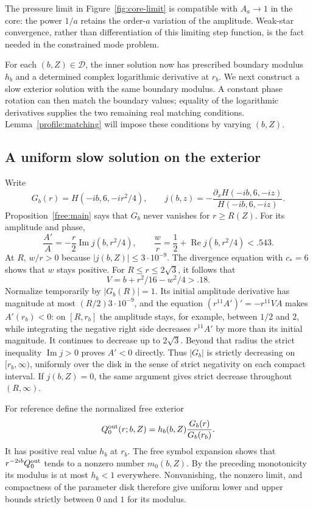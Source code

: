 \documentclass[11pt]{article}
\numberwithin{equation}{section}
\theoremstyle{definition}
\theoremstyle{remark}
\begin{document}
The pressure limit in Figure~\ref{fig:core-limit} is compatible with
$A_a\to1$ in the core: the power $1/a$ retains the order-$a$ variation of
the amplitude.  Weak-star convergence, rather than differentiation of
this limiting step function, is the fact needed in the constrained mode
problem.

For each $(b,Z)\in\mathcal D$, the inner solution now has prescribed
boundary modulus $h_b$ and a determined complex logarithmic derivative
at $r_b$. We next construct a slow exterior solution with the same
boundary modulus. A constant phase rotation can then match the boundary
values; equality of the logarithmic derivatives supplies the two
remaining real matching conditions. Lemma~\ref{profile:matching} will
impose these conditions by varying $(b,Z)$.

\subsection{A uniform slow solution on the exterior}

Write
\[
 G_b(r)=H(-ib,6,-ir^2/4),\qquad
 j(b,z)=-\frac{\partial_xH(-ib,6,-iz)}{H(-ib,6,-iz)}.
\]
Proposition~\ref{free:main} says that $G_b$ never vanishes for
$r\ge R(Z)$.  For its amplitude and phase,
\begin{equation}\label{profile:free-j}
 \frac{A'}A=-\frac r2\operatorname{Im}j(b,r^2/4),\qquad
 \frac wr=\frac12+\operatorname{Re}j(b,r^2/4)<.543.
\end{equation}
At $R$, $w/r>0$ because $|j(b,Z)|\le3\cdot10^{-9}$.
The divergence equation with $c_*=6$ shows that $w$ stays positive.
For $R\le r\le2\sqrt3$, it follows that
\[
 V=b+r^2/16-w^2/4>.18.
\]
Normalize temporarily by $|G_b(R)|=1$.  Its initial amplitude derivative
has magnitude at most $(R/2)3\cdot10^{-9}$, and the equation
$(r^{11}A')'=-r^{11}VA$ makes $A'(r_b)<0$: on $[R,r_b]$ the amplitude
stays, for example, between $1/2$ and $2$, while integrating the negative
right side decreases $r^{11}A'$ by more than its initial magnitude.
It continues to decrease up to $2\sqrt3$.  Beyond that radius the strict
inequality $\operatorname{Im}j>0$ proves $A'<0$ directly.  Thus $|G_b|$
is strictly decreasing on $[r_b,\infty)$, uniformly over the disk in the
sense of strict negativity on each compact interval.  If $j(b,Z)=0$,
the same argument gives strict decrease throughout $(R,\infty)$.

For reference define the normalized free exterior
\begin{equation}\label{profile:normalized-free}
 Q^{\rm out}_0(r;b,Z)=h_b(b,Z)\frac{G_b(r)}{G_b(r_b)}.
\end{equation}
It has positive real value $h_b$ at $r_b$.  The free symbol expansion
shows that $r^{-2ib}Q^{\rm out}_0$ tends to a nonzero number $m_0(b,Z)$.
By the preceding monotonicity its modulus is at most $h_b<1$ everywhere.
Nonvanishing, the nonzero limit, and compactness of the parameter disk
therefore give uniform lower and upper bounds strictly between $0$ and
$1$ for its modulus.
\end{document}
